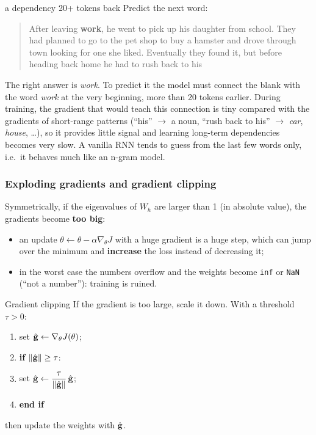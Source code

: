 \begin{nbexample}{a dependency 20+ tokens back}
Predict the next word:
\begin{quote}\small
After leaving \textbf{work}, he went to pick up his daughter from school. They had
planned to go to the pet shop to buy a hamster and drove through town looking for one
she liked. Eventually they found it, but before heading back home he had to rush back
to his \underline{\quad\quad}
\end{quote}
The right answer is \emph{work}. To predict it the model must connect the blank with
the word \emph{work} at the very beginning, more than 20 tokens earlier. During
training, the gradient that would teach this connection is tiny compared with the
gradients of short-range patterns (``his'' $\to$ a noun, ``rush back to his'' $\to$
\emph{car}, \emph{house}, \ldots), so it provides little signal and learning
long-term dependencies becomes very slow. A vanilla RNN tends to guess from the last
few words only, i.e.\ it behaves much like an n-gram model.
\end{nbexample}

\subsubsection{Exploding gradients and gradient clipping}

Symmetrically, if the eigenvalues of $W_h$ are larger than 1 (in absolute value), the
gradients become \textbf{too big}:
\begin{itemize}[nosep]
  \item an update $\theta \leftarrow \theta - \alpha \nabla_\theta J$ with a huge
        gradient is a huge step, which can jump over the minimum and
        \textbf{increase} the loss instead of decreasing it;
  \item in the worst case the numbers overflow and the weights become
        \texttt{inf} or \texttt{NaN} (``not a number''): training is ruined.
\end{itemize}

\begin{nbdef}{Gradient clipping}
If the gradient is too large, scale it down. With a threshold $\tau > 0$:
\begin{enumerate}[nosep]
  \item set $\hat{\mathbf{g}} \leftarrow \nabla_\theta J(\theta)$;
  \item \textbf{if} $\lVert \hat{\mathbf{g}}\rVert \ge \tau$:
  \item \quad set $\hat{\mathbf{g}} \leftarrow \dfrac{\tau}{\lVert \hat{\mathbf{g}}\rVert}\,
        \hat{\mathbf{g}}$;
  \item \textbf{end if}
\end{enumerate}
then update the weights with $\hat{\mathbf{g}}$.
\end{nbdef}


